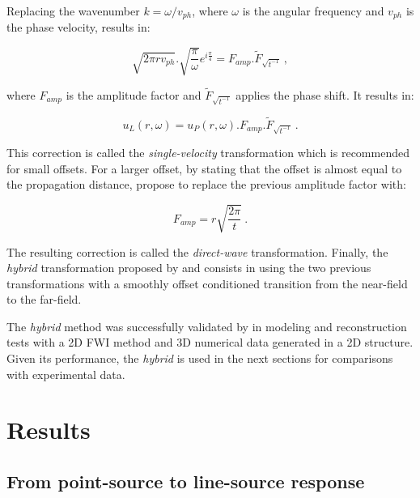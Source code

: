 \documentclass[manuscript,revised]{geophysics}
\begin{document}
\noindent Replacing the wavenumber $k=\omega/v_{ph}$, where $\omega$ is the angular frequency and $v_{ph}$ is the phase velocity, results in:

\begin{equation}
\sqrt{2\pi r v_{ph}}.\sqrt{\frac{\pi}{\omega}}e^{i\frac{\pi}{4}}=F_{amp}.\widetilde{F}_{\sqrt{t^{-1}}}\ ,
\end{equation}

\noindent where $F_{amp}$ is the amplitude factor and $\widetilde{F}_{\sqrt{t^{-1}}}$ applies the phase shift. It results in:

\begin{equation}
u_{L}(r,\omega)=u_{P}(r,\omega).F_{amp}.\widetilde{F}_{\sqrt{t^{-1}}}\ .
\label{eq:single-velocity}
\end{equation}

\noindent This correction is called the \textit{single-velocity} transformation which is recommended for small offsets. For a larger offset, by stating that the offset is almost equal to the propagation distance, \citet{Schafer_LSS_2014} propose to replace the previous amplitude factor with:

\begin{equation}
\label{eq:direct-wave}
F_{amp}=r\sqrt{\frac{2 \pi}{t}}\ .
\end{equation}

\noindent The resulting correction is called the \textit{direct-wave} transformation. Finally, the \textit{hybrid} transformation proposed by \citet{Forbriger_LSS_2014} and \citet{Schafer_LSS_2014} consists in using the two previous transformations with a smoothly offset conditioned transition from the near-field to the far-field.

\noindent The \textit{hybrid} method was successfully validated by \citet{Schafer_LSS_2014} in modeling and reconstruction tests with a 2D FWI method and 3D numerical data generated in a 2D structure. Given its performance, the \textit{hybrid} is used in the next sections for comparisons with experimental data. 

\section{Results}

\subsection{From point-source to line-source response}
\end{document}

